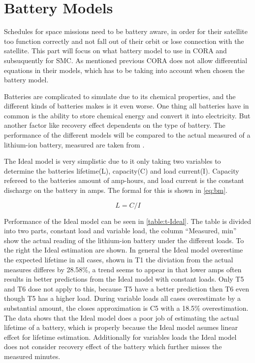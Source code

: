 \section{Battery Models}\label{sec:kibam}
Schedules for space missions need to be battery aware, in order for their satellite too function correctly and not fall out of their orbit or lose connection with the satellite. This part will focus on what battery model to use in CORA and subsuquently for SMC. As mentioned previous CORA does not allow differential equations in their models, which has to be taking into account when chosen the battery model.

Batteries are complicated to simulate due to its chemical properties, and the different kinds of batteries makes is it even worse. One thing all batteries have in common is the ability to store chemical energy and convert it into electricity. But another factor like recovery effect dependents on the type of battery. The performance of the different models will be compared to the actual measured of a lithium-ion battery, measured are taken from \cite{battery_lifetime_analysis}.

The Ideal model is very simplistic due to it only taking two variables to determine the batteries lifetime(L), capacity(C) and load current(I). Capacity refereed to the batteries amount of amp-hours, and load current is the constant discharge on the battery in amps. The formal for this is shown in \cref{eq:bm}.

\begin{equation}\label{eq:bm}
L=C/I
\end{equation}

Performance of the Ideal model can be seen in \cref{table:t-Ideal}. The table is divided into two parts, constant load and variable load, the column ``Measured, min'' show the actual reading of the lithium-ion battery under the different loads. To the right the Ideal estimation are shown. In general the Ideal model overestime the expected lifetime in all cases, shown in T1 the diviation from the actual measures differes by 28.58\%, a trend seems to appear in that lower amps often results in better predictions from the Ideal model with constant loads. Only T5 and T6 dose not apply to this, because T5 have a better prediction then T6 even though T5 has a higher load. During variable loads all cases overestimate by a substantial amount, the closes approximation is C5 with a 18.5\% overestimation. The data shows that the Ideal model does a poor job of estimating the actual lifetime of a battery, which is properly because the Ideal model asumes linear effcet for lifetime estimation. Additionally for variables loads the Ideal model does not consider recovery effect of the battery which further misses the measured minutes. 

